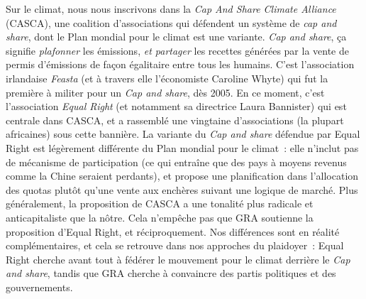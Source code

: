 \documentclass[a5paper,french,openany]{memoir}
\begin{document}
Sur le climat, nous nous inscrivons dans la \textit{Cap And Share Climate Alliance} (CASCA), une coalition d'associations qui défendent un système de \textit{cap and share}, dont le Plan mondial pour le climat est une variante. \textit{Cap and share}, ça signifie \textit{plafonner} les émissions, \textit{et partager} les recettes générées par la vente de permis d'émissions de façon égalitaire entre tous les humains. C'est l'association irlandaise \textit{Feasta} (et à travers elle l'économiste Caroline Whyte) qui fut la première à militer pour un \textit{Cap and share}, dès 2005. En ce moment, c'est l'association \textit{Equal Right} (et notamment sa directrice Laura Bannister) qui est centrale dans CASCA, et a rassemblé une vingtaine d'associations (la plupart africaines) sous cette bannière. La variante du \textit{Cap and share} défendue par Equal Right est légèrement différente du Plan mondial pour le climat~: elle n'inclut pas de mécanisme de participation (ce qui entraîne que des pays à moyens revenus comme la Chine seraient perdants), et propose une planification dans l'allocation des quotas plutôt qu'une vente aux enchères suivant une logique de marché. Plus généralement, la proposition de CASCA a une tonalité plus radicale et anticapitaliste que la nôtre. Cela n'empêche pas que GRA soutienne la proposition d'Equal Right, et réciproquement. Nos différences sont en réalité complémentaires, et cela se retrouve dans nos approches du plaidoyer~: Equal Right cherche avant tout à fédérer le mouvement pour le climat derrière le \textit{Cap and share}, tandis que GRA cherche à convaincre des partis politiques et des gouvernements. 

\end{document}
